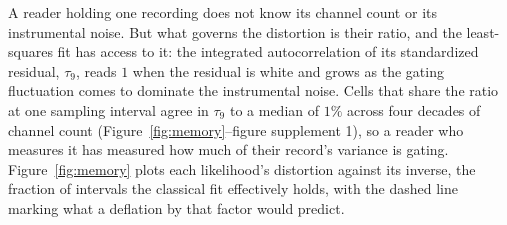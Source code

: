 A reader holding one recording does not know its channel count or its instrumental noise. But
what governs the distortion is their ratio, and the least-squares fit has
access to it: the integrated autocorrelation of its standardized residual, $\tau_{9}$, reads $1$
when the residual is white and grows as the gating fluctuation comes to dominate the instrumental
noise. Cells that share the ratio at one sampling interval agree in $\tau_{9}$ to a median of
$1\%$ across four decades of channel count (Figure~\ref{fig:memory}--figure supplement 1), so a
reader who measures it has measured how much of their record's variance is gating.
Figure~\ref{fig:memory} plots each likelihood's distortion against its inverse, the fraction of
intervals the classical fit effectively holds, with the dashed line marking what a deflation by
that factor would predict.

%

